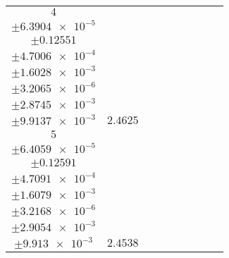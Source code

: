 \documentclass[8pt]{article}
\begin{document}
\begin{longtable}[l]{c c c c c c c c c}
$\num{4}$ & \begin{tabular}[c]{@{}c@{}}$\num{2.988e-2}$ \\ $\pm\num{6.3904e-5}$\end{tabular} & \begin{tabular}[c]{@{}c@{}}$\num{-0.35285}$ \\ $\pm\num{0.12551}$\end{tabular} & \begin{tabular}[c]{@{}c@{}}$\num{-4.9838}$ \\ $\pm\num{4.7006e-4}$\end{tabular} & \begin{tabular}[c]{@{}c@{}}$\num{725.59}$ \\ $\pm\num{1.6028e-3}$\end{tabular} & \begin{tabular}[c]{@{}c@{}}$\num{1.4516}$ \\ $\pm\num{3.2065e-6}$\end{tabular} & \begin{tabular}[c]{@{}c@{}}$\num{1.1473}$ \\ $\pm\num{2.8745e-3}$\end{tabular} & \begin{tabular}[c]{@{}c@{}}$\num{4.1993}$ \\ $\pm\num{9.9137e-3}$\end{tabular} & $\num{2.4625}$\\
$\num{5}$ & \begin{tabular}[c]{@{}c@{}}$\num{2.975e-2}$ \\ $\pm\num{6.4059e-5}$\end{tabular} & \begin{tabular}[c]{@{}c@{}}$\num{0.65012}$ \\ $\pm\num{0.12591}$\end{tabular} & \begin{tabular}[c]{@{}c@{}}$\num{4.9821}$ \\ $\pm\num{4.7091e-4}$\end{tabular} & \begin{tabular}[c]{@{}c@{}}$\num{735.55}$ \\ $\pm\num{1.6079e-3}$\end{tabular} & \begin{tabular}[c]{@{}c@{}}$\num{1.4715}$ \\ $\pm\num{3.2168e-6}$\end{tabular} & \begin{tabular}[c]{@{}c@{}}$\num{1.1499}$ \\ $\pm\num{2.9054e-3}$\end{tabular} & \begin{tabular}[c]{@{}c@{}}$\num{4.1877}$ \\ $\pm\num{9.913e-3}$\end{tabular} & $\num{2.4538}$\\

\end{longtable}
\end{document}
